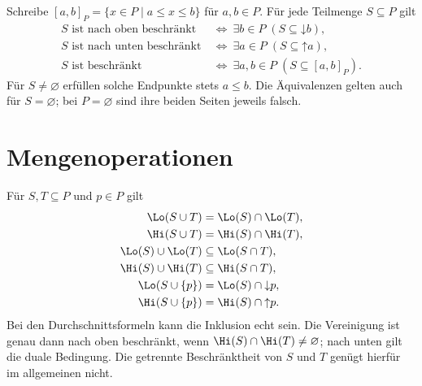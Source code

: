 \begin{theorem}
\label{b13guide:thm:bounded-interval}
Schreibe $[a,b]_P=\{x\in P\mid a\leq x\leq b\}$ für $a,b\in P$.
Für jede Teilmenge $S\subseteq P$ gilt
\[
\begin{aligned}
 S\text{ ist nach oben beschränkt}
   &\ \Longleftrightarrow\ \exists b\in P\;(S\subseteq\mathord\downarrow b),\\
 S\text{ ist nach unten beschränkt}
   &\ \Longleftrightarrow\ \exists a\in P\;(S\subseteq\mathord\uparrow a),\\
 S\text{ ist beschränkt}
   &\ \Longleftrightarrow\ \exists a,b\in P\;(S\subseteq[a,b]_P).
\end{aligned}
\]
Für $S\ne\varnothing$ erfüllen solche Endpunkte stets $a\leq b$.
Die Äquivalenzen gelten auch für $S=\varnothing$;
bei $P=\varnothing$ sind ihre beiden Seiten jeweils falsch.
\end{theorem}

\section{Mengenoperationen}

\begin{theorem}
\label{b13guide:thm:operations}
Für $S,T\subseteq P$ und $p\in P$ gilt
\[
\begin{aligned}
 \Lo(S\cup T)&=\Lo(S)\cap\Lo(T),\\
 \Hi(S\cup T)&=\Hi(S)\cap\Hi(T),\\
 \Lo(S)\cup\Lo(T)&\subseteq\Lo(S\cap T),\\
 \Hi(S)\cup\Hi(T)&\subseteq\Hi(S\cap T),\\
 \Lo(S\cup\{p\})&=\Lo(S)\cap\mathord\downarrow p,\\
 \Hi(S\cup\{p\})&=\Hi(S)\cap\mathord\uparrow p.
\end{aligned}
\]
Bei den Durchschnittsformeln kann die Inklusion echt sein.
Die Vereinigung ist genau dann nach oben beschränkt, wenn
$\Hi(S)\cap\Hi(T)\ne\varnothing$; nach unten gilt die duale Bedingung.
Die getrennte Beschränktheit von $S$ und $T$ genügt hierfür
im allgemeinen nicht.
\end{theorem}

